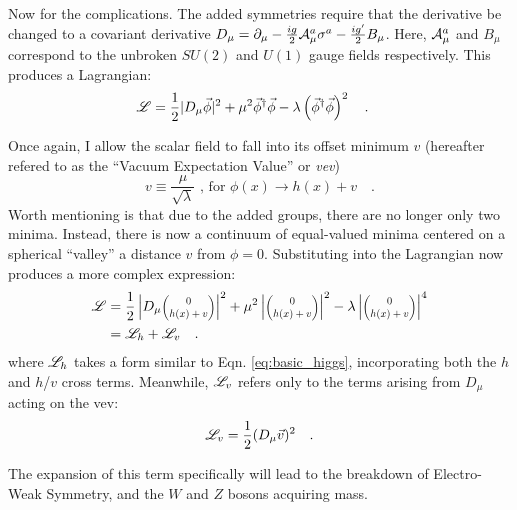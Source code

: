    Now for the complications.
    The added symmetries require that the derivative be changed to a covariant derivative 
        $D_{\mu} = \partial_{\mu} - \frac{ig}{2} \mathcal{A}^a_{\mu} \sigma^a - \frac{ig'}{2} B_{\mu}$.
    Here, $\mathcal{A}^a_\mu$ and $B_\mu$ correspond to the unbroken $SU(2)$ and $U(1)$ gauge fields respectively.
    This produces a Lagrangian:
    \begin{equation} \begin{split}
        \mathscr{L} &= \frac{1}{2} |D_{\mu} \vec{\phi}|^2 +
            \mu^2 \vec{\phi}^\dag \vec{\phi} - \lambda \left( \vec{\phi}^\dag\vec{\phi} \right)^2
        \quad.
    \end{split} \end{equation}


    Once again, I allow the scalar field to fall into its offset minimum $v$
        (hereafter refered to as the ``Vacuum Expectation Value'' or \textit{vev})
    \begin{equation}
        v \equiv \frac{\mu}{\sqrt{\lambda}} \textrm{ , for } \phi(x) \to h(x) + v
        \quad.
    \end{equation}
    Worth mentioning is that due to the added groups, there are no longer only two minima.
    Instead, there is now a continuum of equal-valued minima centered on a spherical ``valley'' a distance $v$ from $\phi=0$.
    Substituting into the Lagrangian now produces a more complex expression:
    \begin{equation} \begin{split}
        \label{eq:fullHiggs}
        \Lag & = \frac{1}{2} \left|D_{\mu} \minimatrix{0\\h(x)+v}\right|^2
            + \mu^2 \left|\minimatrix{0\\h(x)+v}\right|^2
            - \lambda \left|\minimatrix{0\\h(x)+v}\right|^4 \\
         & = \Lag_h + \Lag_v
        \quad.
    \end{split} \end{equation}
    where $\mathscr{L}_h$ takes a form similar to Eqn. \ref{eq:basic_higgs}, incorporating both the $h$ and $h$/$v$ cross terms.
    Meanwhile, $\mathscr{L}_v$ refers only to the terms arising from $D_{\mu}$ acting on the vev:
    \begin{equation}
        \label{eq:lagv}
        \mathscr{L}_v = \frac{1}{2} (D_{\mu} \vec{v})^2
        \quad.
    \end{equation}

    The expansion of this term specifically will lead to the breakdown of Electro-Weak Symmetry,
        and the $W$ and $Z$ bosons acquiring mass.

